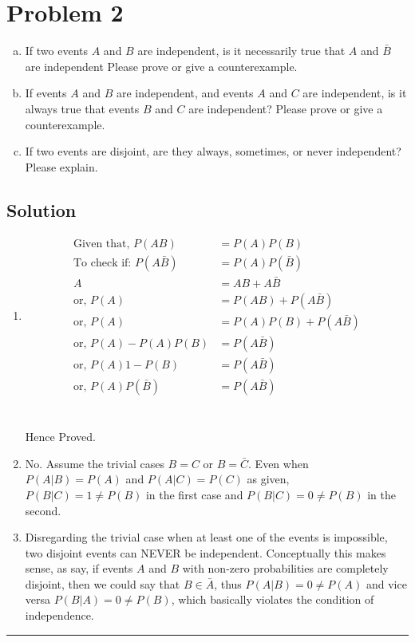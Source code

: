 \section{Problem 2}

\begin{enumerate}[a.]
	\item If two events $A$ and $B$ are independent, is it necessarily true that $A$ and $\bar{B}$ are independent Please prove or give a counterexample.
	\item If events $A$ and $B$ are independent, and events $A$ and $C$ are independent, is it always true that events $B$ and $C$ are independent? Please prove or give a counterexample.
	\item If two events are disjoint, are they always, sometimes, or never independent? Please explain.
\end{enumerate}

\subsection{Solution}
\begin{enumerate}[2a.]
	\item
	\begin{align}
		\text{Given that, } P(AB) &= P(A)P(B) \label{eq:given1} \\
		\text{To check if: } P(A\bar{B}) &= P(A)P(\bar{B}) \label{eq:toCheck1} \\
		A &= AB + A\bar{B} \label{eq:LOTPAB}\\
		\text{or, } P(A) &= P(AB) + P(A\bar{B}) \nonumber\\
		\text{or, } P(A) &= P(A)P(B) + P(A\bar{B}) \nonumber\\
		\text{or, } P(A) - P(A)P(B) &= P(A\bar{B}) \nonumber\\
		\text{or, } P(A){1-P(B)} &= P(A\bar{B}) \nonumber\\
		\text{or, } P(A)P(\bar{B}) &= P(A\bar{B}) \nonumber
	\end{align}
	 \\
	\\
	Hence Proved.\Laughey
	
	\item No. Assume the trivial cases $B = C$ or $B = \bar{C}$. Even when $P(A|B) = P(A)$ and $P(A|C) = P(C)$ as given, $P(B|C) = 1 \neq P(B)$ in the first case and $P(B|C) = 0 \neq P(B)$ in the second.
	
	\item Disregarding the trivial case when at least one of the events is impossible, two disjoint events can NEVER be independent. Conceptually this makes sense, as say, if events $A$ and $B$ with non-zero probabilities are completely disjoint, then we could say that $B \in \bar{A}$, thus $P(A|B) = 0 \neq P(A)$ and vice versa $P(B|A) = 0 \neq P(B)$, which basically violates the condition of independence.
\end{enumerate} 
\noindent\rule{\textwidth}{1pt}